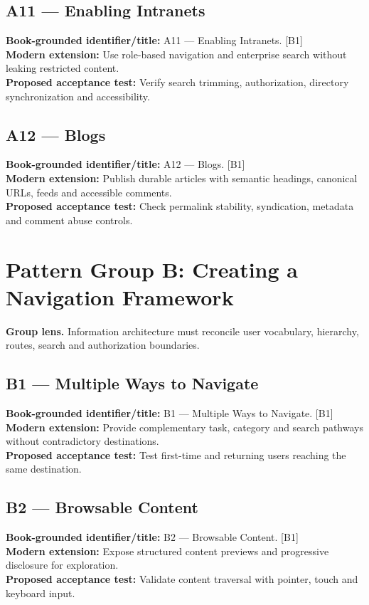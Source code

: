 \documentclass[11pt]{article}
\begin{document}
\subsection{A11 — Enabling Intranets}
\noindent\textcolor{Ocean}{\textbf{Book-grounded identifier/title:}} A11 — Enabling Intranets. [B1]\\
\textcolor{Mint}{\textbf{Modern extension:}} Use role-based navigation and enterprise search without leaking restricted content.\\
\textcolor{Amber}{\textbf{Proposed acceptance test:}} Verify search trimming, authorization, directory synchronization and accessibility.\medskip
\subsection{A12 — Blogs}
\noindent\textcolor{Ocean}{\textbf{Book-grounded identifier/title:}} A12 — Blogs. [B1]\\
\textcolor{Mint}{\textbf{Modern extension:}} Publish durable articles with semantic headings, canonical URLs, feeds and accessible comments.\\
\textcolor{Amber}{\textbf{Proposed acceptance test:}} Check permalink stability, syndication, metadata and comment abuse controls.\medskip
\section{Pattern Group B: Creating a Navigation Framework}

\begin{notebox}\textbf{Group lens.} Information architecture must reconcile user vocabulary, hierarchy, routes, search and authorization boundaries.\end{notebox}
\subsection{B1 — Multiple Ways to Navigate}
\noindent\textcolor{Ocean}{\textbf{Book-grounded identifier/title:}} B1 — Multiple Ways to Navigate. [B1]\\
\textcolor{Mint}{\textbf{Modern extension:}} Provide complementary task, category and search pathways without contradictory destinations.\\
\textcolor{Amber}{\textbf{Proposed acceptance test:}} Test first-time and returning users reaching the same destination.\medskip
\subsection{B2 — Browsable Content}
\noindent\textcolor{Ocean}{\textbf{Book-grounded identifier/title:}} B2 — Browsable Content. [B1]\\
\textcolor{Mint}{\textbf{Modern extension:}} Expose structured content previews and progressive disclosure for exploration.\\
\textcolor{Amber}{\textbf{Proposed acceptance test:}} Validate content traversal with pointer, touch and keyboard input.\medskip
\end{document}
